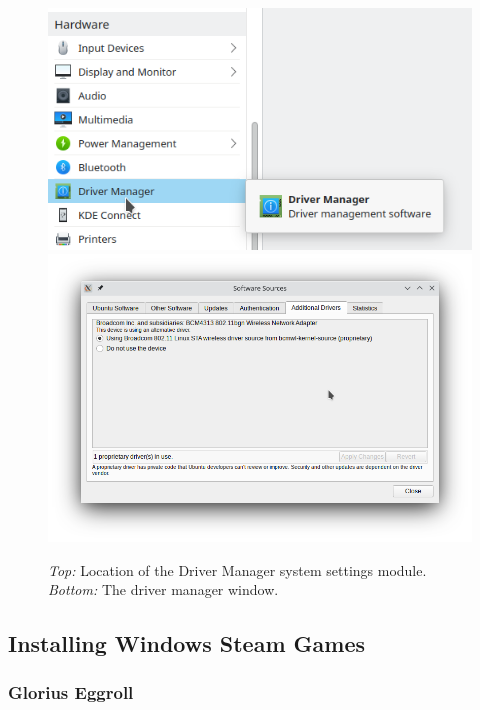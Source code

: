 \documentclass[a4paper, 12pt]{article}
\begin{document}
\begin{figure}[h]
 \centering
 \includegraphics[width=0.6\linewidth]{images/driver_manager_location}
 \includegraphics[width=0.6\linewidth]{images/driver_manager_window}
 \caption{\textit{Top:} Location of the Driver Manager system settings module. \textit{Bottom:} The driver manager window.}\label{fig:drivers}
\end{figure}



\subsection{Installing Windows Steam Games}

\subsubsection{Glorius Eggroll}

\printbibliography
\end{document}
